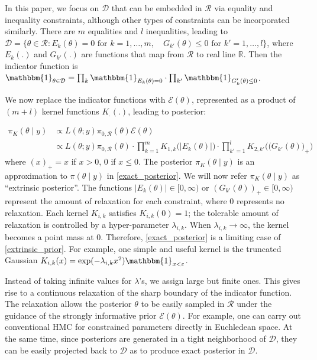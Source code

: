 \documentclass[10pt]{article}
\newcommand{\mc}[1]{\mathcal{#1}}
\begin{document}
In this paper, we focus on $\mc D$ that can be embedded in $\mc R$ via equality and inequality constraints, although other types of constraints can be incorporated similarly. There are $m$ equalities and $l$ inequalities, leading to $\mc D = \{ \theta \in \mc R: E_k(\theta)=0 \text{ for } k=1,\ldots,m, \quad G_{k'}(\theta)\le 0  \text{ for } k'=1,\ldots,l \}$, where $E_k(.)$ and $G_{k'}(.)$ are functions that map from $\mc R$ to real line $\mathbb R$. Then the indicator function is $\mathbbm{1}_{\theta\in \mc D} = \prod_k \mathbbm{1}_{E_k(\theta)=0} \cdot \prod_{k'}\mathbbm{1}_{G_k'(\theta)\le 0}$.


We now replace the indicator functions with $\mc E(\theta)$, represented as a product of $(m+l)$ kernel functions $K_.(.)$, leading to posterior:

\begin{equation}
\begin{aligned}
\label{extrinsic_prior}
\pi_{K}(\theta \mid y) & \propto L(\theta;y)\pi_{0,\mc R}(\theta) \mc E(\theta) \\
&\propto L(\theta;y)\pi_{0,\mc R}(\theta) \cdot \prod_{k=1}^{m} K_{1,k}\Big( | E_k(\theta)| \Big) \cdot \prod_{k'=1}^{l} K_{2,k'}\Big( \big( G_{k'}(\theta) \big)_+ \Big)
\end{aligned}
\end{equation}
where $(x)_+ = x$ if $x>0$, $0$ if $x\le 0$. The posterior $\pi_{K}(\theta \mid y)$ is an approximation to $\pi(\theta \mid y)$ in \eqref{exact_posterior}. We will now refer $\pi_{K}(\theta \mid y)$ as ``extrinsic posterior''. The functions $|E_k(\theta)|\in [0,\infty)$ or $(G_{k'}(\theta))_+ \in [0,\infty)$ represent the amount of relaxation for each constraint, where $0$ represents no relaxation. Each kernel $K_{i,k}$ satisfies $K_{i,k}(0)=1$; the tolerable amount of relaxation is controlled by a hyper-parameter $\lambda_{i,k}$. When $\lambda_{i,k} \rightarrow \infty$, the kernel becomes a point mass at $0$. Therefore, \eqref{exact_posterior} is a limiting case of \eqref{extrinsic_prior}. For example, one simple and useful kernel is the truncated Gaussian $K_{i,k}(x) = \exp( -{\lambda_{i,k} x^2}) \mathbbm{1}_{x<\varepsilon}$.

Instead of taking infinite values for $\lambda$'s, we assign large but finite ones. This gives rise to a continuous relaxation of the sharp boundary of the indicator function. The relaxation allows the posterior $\theta$ to be easily sampled in $\mc R$ under the guidance of the strongly informative prior $\mc E(\theta)$. For example, one can carry out conventional HMC for constrained parameters directly in Euchledean space. At the same time, since posteriors are generated in a tight neighborhood of $\mc D$, they can be easily projected back to $\mc D$ as to produce exact posterior in $\mc D$.
\end{document}
